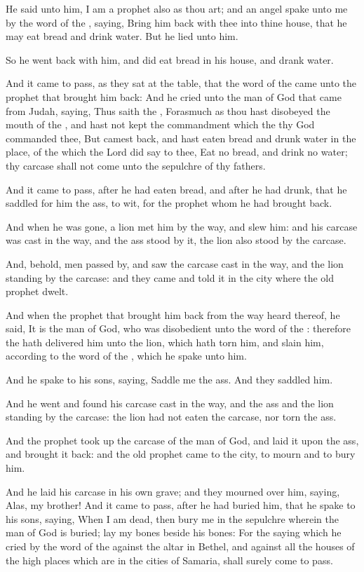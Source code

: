 \Verse He said unto him, I am a prophet also as thou art; and an angel spake unto me by the word of the \LORD, saying, Bring him back with thee into thine house, that he may eat bread and drink water. But he lied unto him.

\Verse So he went back with him, and did eat bread in his house, and drank water.

\Verse And it came to pass, as they sat at the table, that the word of the \LORD came unto the prophet that brought him back: \Verse And he cried unto the man of God that came from Judah, saying, Thus saith the \LORD, Forasmuch as thou hast disobeyed the mouth of the \LORD, and hast not kept the commandment which the \LORD thy God commanded thee, \Verse But camest back, and hast eaten bread and drunk water in the place, of the which the Lord did say to thee, Eat no bread, and drink no water; thy carcase shall not come unto the sepulchre of thy fathers.

\Verse And it came to pass, after he had eaten bread, and after he had drunk, that he saddled for him the ass, to wit, for the prophet whom he had brought back.

\Verse And when he was gone, a lion met him by the way, and slew him: and his carcase was cast in the way, and the ass stood by it, the lion also stood by the carcase.

\Verse And, behold, men passed by, and saw the carcase cast in the way, and the lion standing by the carcase: and they came and told it in the city where the old prophet dwelt.

\Verse And when the prophet that brought him back from the way heard thereof, he said, It is the man of God, who was disobedient unto the word of the \LORD: therefore the \LORD hath delivered him unto the lion, which hath torn him, and slain him, according to the word of the \LORD, which he spake unto him.

\Verse And he spake to his sons, saying, Saddle me the ass. And they saddled him.

\Verse And he went and found his carcase cast in the way, and the ass and the lion standing by the carcase: the lion had not eaten the carcase, nor torn the ass.

\Verse And the prophet took up the carcase of the man of God, and laid it upon the ass, and brought it back: and the old prophet came to the city, to mourn and to bury him.

\Verse And he laid his carcase in his own grave; and they mourned over him, saying, Alas, my brother!  \Verse And it came to pass, after he had buried him, that he spake to his sons, saying, When I am dead, then bury me in the sepulchre wherein the man of God is buried; lay my bones beside his bones: \Verse For the saying which he cried by the word of the \LORD against the altar in Bethel, and against all the houses of the high places which are in the cities of Samaria, shall surely come to pass.

